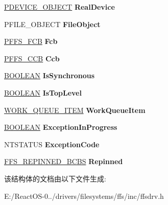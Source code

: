 \begin{DoxyCompactItemize}
\hyperlink{struct___d_e_v_i_c_e___o_b_j_e_c_t}{P\+D\+E\+V\+I\+C\+E\+\_\+\+O\+B\+J\+E\+CT} {\bfseries Real\+Device}
\item 
\mbox{\label{struct___f_f_s___i_r_p___c_o_n_t_e_x_t_a208b36103efd60feab853a0fc4f8b72b}} 
P\+F\+I\+L\+E\+\_\+\+O\+B\+J\+E\+CT {\bfseries File\+Object}
\item 
\mbox{\label{struct___f_f_s___i_r_p___c_o_n_t_e_x_t_a597248dfd9857d033ce765ee0b26dd14}} 
\hyperlink{struct___f_f_s___f_c_b}{P\+F\+F\+S\+\_\+\+F\+CB} {\bfseries Fcb}
\item 
\mbox{\label{struct___f_f_s___i_r_p___c_o_n_t_e_x_t_aa455d6d68b4939fdc7540f86bb39fa1c}} 
\hyperlink{struct___f_f_s___c_c_b}{P\+F\+F\+S\+\_\+\+C\+CB} {\bfseries Ccb}
\item 
\mbox{\label{struct___f_f_s___i_r_p___c_o_n_t_e_x_t_a19cedbe0475424aaa7d8058e018333eb}} 
\hyperlink{_processor_bind_8h_a112e3146cb38b6ee95e64d85842e380a}{B\+O\+O\+L\+E\+AN} {\bfseries Is\+Synchronous}
\item 
\mbox{\label{struct___f_f_s___i_r_p___c_o_n_t_e_x_t_a483c4be2f1a34f4036c7b2c0deb7a36b}} 
\hyperlink{_processor_bind_8h_a112e3146cb38b6ee95e64d85842e380a}{B\+O\+O\+L\+E\+AN} {\bfseries Is\+Top\+Level}
\item 
\mbox{\label{struct___f_f_s___i_r_p___c_o_n_t_e_x_t_ad6b0806f25891a951fa656d11f4f1171}} 
\hyperlink{struct___w_o_r_k___q_u_e_u_e___i_t_e_m}{W\+O\+R\+K\+\_\+\+Q\+U\+E\+U\+E\+\_\+\+I\+T\+EM} {\bfseries Work\+Queue\+Item}
\item 
\mbox{\label{struct___f_f_s___i_r_p___c_o_n_t_e_x_t_ac94d80318a040c36d446633d3031463a}} 
\hyperlink{_processor_bind_8h_a112e3146cb38b6ee95e64d85842e380a}{B\+O\+O\+L\+E\+AN} {\bfseries Exception\+In\+Progress}
\item 
\mbox{\label{struct___f_f_s___i_r_p___c_o_n_t_e_x_t_aa73ee0967a699646e0a4043c43c55f93}} 
N\+T\+S\+T\+A\+T\+US {\bfseries Exception\+Code}
\item 
\mbox{\label{struct___f_f_s___i_r_p___c_o_n_t_e_x_t_adedfbc3524138b57d60002da7ef525fd}} 
\hyperlink{struct___f_f_s___r_e_p_i_n_n_e_d___b_c_b_s}{F\+F\+S\+\_\+\+R\+E\+P\+I\+N\+N\+E\+D\+\_\+\+B\+C\+BS} {\bfseries Repinned}
\end{DoxyCompactItemize}


该结构体的文档由以下文件生成\+:\begin{DoxyCompactItemize}
\item 
E\+:/\+React\+O\+S-\/0../drivers/filesystems/ffs/inc/ffsdrv.\+h\end{DoxyCompactItemize}
